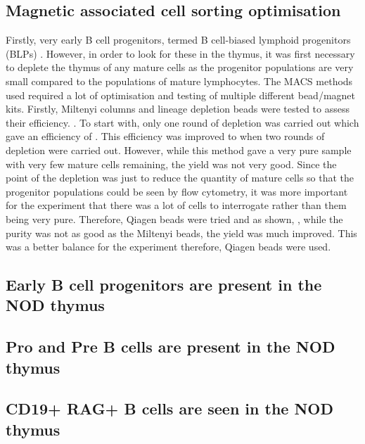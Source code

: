 \subsection{Magnetic associated cell sorting optimisation}
Firstly, very early B cell progenitors, termed B cell-biased lymphoid progenitors (BLPs) .
However, in order to look for these in the thymus, it was first necessary to deplete the thymus of any mature cells as the progenitor populations are very small compared to the populations of mature lymphocytes.
The MACS methods used required a lot of optimisation and testing of multiple different bead/magnet kits. 
Firstly, Miltenyi columns and lineage depletion beads were tested to assess their efficiency. 
.
To start with, only one round of depletion was carried out which gave an efficiency of .
This efficiency was improved to  when two rounds of depletion were carried out. 
However, while this method gave a very pure sample with very few mature cells remaining, the yield was not very good.
Since the point of the depletion was just to reduce the quantity of mature cells so that the progenitor populations could be seen by flow cytometry, it was more important for the experiment that there was a lot of cells to interrogate rather than them being very pure.
Therefore, Qiagen beads  were tried and as shown, , while the purity was not as good as the Miltenyi beads, the yield was much improved.
This was a better balance for the experiment therefore, Qiagen beads were used.

\subsection{Early B cell progenitors are present in the NOD thymus}

\subsection{Pro and Pre B cells are present in the NOD thymus}

\subsection{CD19+ RAG+ B cells are seen in the NOD thymus}


